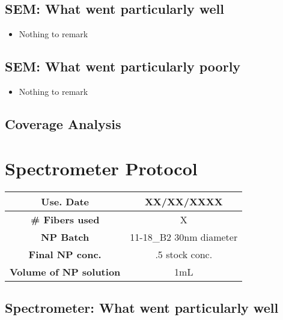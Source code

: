 
\subsection{SEM: {\color{blue} What went particularly well}}

\begin{itemize}
\item{Nothing to remark}
\end{itemize}

\subsection{SEM: {\color{red} What went particularly poorly}}

\begin{itemize}
\item{Nothing to remark}
\end{itemize}

\subsection{Coverage Analysis}


\section{Spectrometer Protocol}

\begin{center}
\begin{tabular}{| c | c |}
 \hline
 {\bf Use. Date} & XX/XX/XXXX \\ \hline
 {\bf \# Fibers used} & X \\ \hline
 {\bf NP Batch} & 11-18\_B2 30nm diameter \\ \hline
 {\bf Final NP conc.} & .5 stock conc.  \\ \hline
 {\bf Volume of NP solution} & 1mL \\ \hline
\end{tabular}
\end{center}

\vspace{.3cm}


\subsection{Spectrometer: {\color{blue} What went particularly well}}

